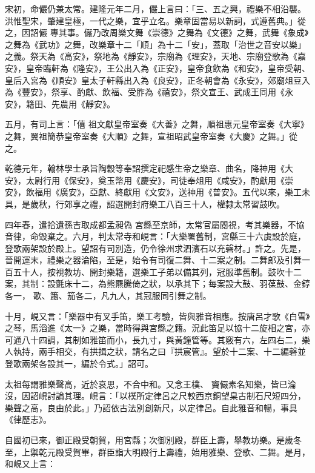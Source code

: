 \begin{pinyinscope}
 宋初，命儼仍兼太常。建隆元年二月，儼上言曰：「三、五之興，禮樂不相沿襲。洪惟聖宋，肇建皇極，一代之樂，宜乎立名。樂章固當易以新詞，式遵舊典。」從之，因詔儼
 專其事。儼乃改周樂文舞《崇德》之舞為《文德》之舞，武舞《象成》之舞為《武功》之舞，改樂章十二「順」為十二「安」，蓋取「治世之音安以樂」之義。祭天為《高安》，祭地為《靜安》，宗廟為《理安》，天地、宗廟登歌為《嘉安》，皇帝臨軒為《隆安》，王公出入為《正安》，皇帝食飲為《和安》，皇帝受朝、皇后入宮為《順安》皇太子軒縣出入為《良安》，正冬朝會為《永安》，郊廟俎豆入為《豐安》，祭享、酌獻、飲福、受胙為《禧安》，祭文宣王、武成王同用《永安》，籍田、先農用《靜安》。



 五月，有司上言：「僖
 祖文獻皇帝室奏《大善》之舞，順祖惠元皇帝室奏《大寧》之舞，翼祖簡恭皇帝室奏《大順》之舞，宣祖昭武皇帝室奏《大慶》之舞。」從之。



 乾德元年，翰林學士承旨陶穀等奉詔撰定祀感生帝之樂章、曲名，降神用《大安》，太尉行用《保安》，奠玉幣用《慶安》，司徒奉俎用《咸安》，酌獻用《崇安》，飲福用《廣安》，亞獻、終獻用《文安》，送神用《普安》。五代以來，樂工未具，是歲秋，行郊享之禮，詔選開封府樂工八百三十人，權隸太常習鼓吹。



 四年春，遣拾遺孫吉取成都孟昶偽
 宮縣至京師，太常官屬閱視，考其樂器，不協音律，命毀棄之。六月，判太常寺和峴言：「大樂署舊制，宮縣三十六虡設於庭，登歌兩架設於殿上。望詔有司別造，仍令徐州求泗濱石以充磬材。」許之。先是，晉開運末，禮樂之器淪陷，至是，始令有司復二舞、十二案之制。二舞郎及引舞一百五十人，按視教坊、開封樂籍，選樂工子弟以備其列，冠服準舊制。鼓吹十二案，其制：設氈床十二，為熊羆騰倚之狀，以承其下；每案設大鼓、羽葆鼓、金錞各一，
 歌、簫、笳各二，凡九人，其冠服同引舞之制。



 十月，峴又言：「樂器中有叉手笛，樂工考驗，皆與雅音相應。按唐呂才歌《白雪》之琴，馬滔進《太一》之樂，當時得與宮縣之籍。況此笛足以協十二旋相之宮，亦可通八十四調，其制如雅笛而小，長九寸，與黃鐘管等。其竅有六，左四右二，樂人執持，兩手相交，有拱揖之狀，請名之曰『拱宸管』。望於十二案、十二編磬並登歌兩架各設其一，編於令式。」詔可。



 太祖每謂雅樂聲高，近於哀思，不合中和。又念王樸、
 竇儼素名知樂，皆已淪沒，因詔峴討論其理。峴言：「以樸所定律呂之尺較西京銅望臬古制石尺短四分，樂聲之高，良由於此。」乃詔依古法別創新尺，以定律呂。自此雅音和暢，事具《律歷志》。



 自國初已來，御正殿受朝賀，用宮縣；次御別殿，群臣上壽，舉教坊樂。是歲冬至，上禦乾元殿受賀畢，群臣詣大明殿行上壽禮，始用雅樂、登歌、二舞。是月，和峴又上言：




\end{pinyinscope}
